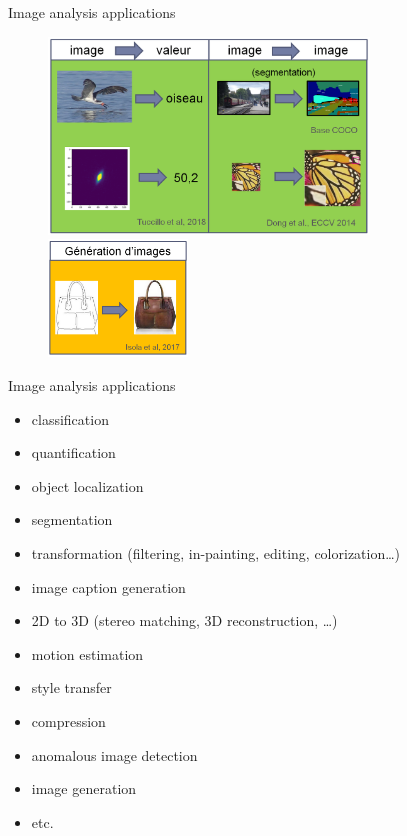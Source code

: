 \documentclass[xcolor=pdftex,dvipsnames,table,mathserif]{beamer}
\begin{document}
\begin{frame}{Image analysis applications}

  \begin{figure}[ht]
    \centering
    \includegraphics[width=0.76\textwidth]{applis_dl_sup}
    \includegraphics[width=0.33\textwidth]{applis_dl_nonsup}
  \end{figure}


\end{frame}


\begin{frame}{Image analysis applications}

  \begin{itemize}
  \item classification
  \item quantification
  \item object localization
  \item segmentation
  \item transformation (filtering, in-painting, editing, colorization…)
  \item image caption generation
  \item 2D to 3D (stereo matching, 3D reconstruction, …)
  \item motion estimation
  \item style transfer
  \item compression
  \item anomalous image detection
  \item image generation
  \item etc.
  \end{itemize}


\end{frame}
\end{document}
